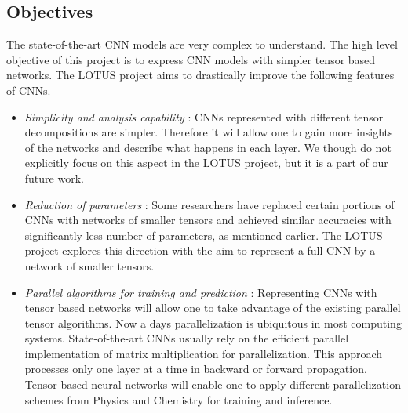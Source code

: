 \documentclass[11pt]{article}
\newcommand{\prname}{LOTUS\xspace}
\begin{document}
\subsection{Objectives}
The state-of-the-art CNN models are very complex to understand. The high level objective of this project is to express CNN models with simpler tensor based networks.  The \prname project aims to drastically improve the following features of CNNs.
\begin{itemize}
	\item \emph{Simplicity and analysis capability} :  CNNs represented with different tensor decompositions are simpler. Therefore it will allow one to gain more insights of the networks and describe what happens in each layer. We though do not explicitly focus on this aspect in the \prname project, but it is a part of our future work.
	\item \emph{Reduction of parameters} : Some researchers have replaced certain portions of CNNs with  networks of smaller tensors and achieved  similar accuracies with significantly less number of parameters, as mentioned earlier. The \prname project explores this direction with the aim to represent a full CNN by a network of smaller tensors. 
	\item \emph{Parallel algorithms for training and prediction} : Representing CNNs with tensor based networks will allow one to take advantage of the existing parallel tensor algorithms. Now a days parallelization is ubiquitous in most computing systems. State-of-the-art CNNs usually rely on the efficient parallel implementation of matrix multiplication for parallelization. This approach processes only one layer at a time in backward or forward propagation. Tensor based neural networks will enable one to apply different parallelization schemes from Physics and Chemistry for training and inference.
\end{itemize}
\end{document}
